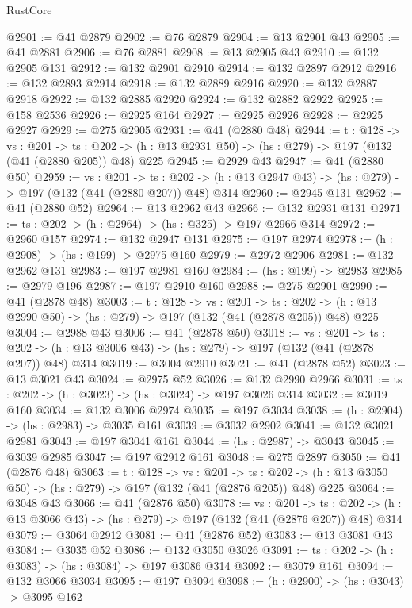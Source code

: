 \begin{lexlean}{RustCore}
\begin{coremodule}
@2901 := @41 @2879
@2902 := @76 @2879
@2904 := @13 @2901 @43
@2905 := @41 @2881
@2906 := @76 @2881
@2908 := @13 @2905 @43
@2910 := @132 @2905 @131
@2912 := @132 @2901 @2910
@2914 := @132 @2897 @2912
@2916 := @132 @2893 @2914
@2918 := @132 @2889 @2916
@2920 := @132 @2887 @2918
@2922 := @132 @2885 @2920
@2924 := @132 @2882 @2922
@2925 := @158 @2536
@2926 := @2925 @164
@2927 := @2925 @2926
@2928 := @2925 @2927
@2929 := @275 @2905
@2931 := @41 (@2880 @48)
@2944 := {t : @128} ->
  {vs : @201} ->
  {ts : @202} -> (h : @13 @2931 @50) -> (hs : @279) -> @197 (@132 (@41 (@2880 @205)) @48) @225
@2945 := @2929 @43
@2947 := @41 (@2880 @50)
@2959 := {vs : @201} ->
  {ts : @202} -> (h : @13 @2947 @43) -> (hs : @279) -> @197 (@132 (@41 (@2880 @207)) @48) @314
@2960 := @2945 @131
@2962 := @41 (@2880 @52)
@2964 := @13 @2962 @43
@2966 := @132 @2931 @131
@2971 := {ts : @202} -> (h : @2964) -> (hs : @325) -> @197 @2966 @314
@2972 := @2960 @157
@2974 := @132 @2947 @131
@2975 := @197 @2974
@2978 := (h : @2908) -> (hs : @199) -> @2975 @160
@2979 := @2972 @2906
@2981 := @132 @2962 @131
@2983 := @197 @2981 @160
@2984 := (hs : @199) -> @2983
@2985 := @2979 @196
@2987 := @197 @2910 @160
@2988 := @275 @2901
@2990 := @41 (@2878 @48)
@3003 := {t : @128} ->
  {vs : @201} ->
  {ts : @202} -> (h : @13 @2990 @50) -> (hs : @279) -> @197 (@132 (@41 (@2878 @205)) @48) @225
@3004 := @2988 @43
@3006 := @41 (@2878 @50)
@3018 := {vs : @201} ->
  {ts : @202} -> (h : @13 @3006 @43) -> (hs : @279) -> @197 (@132 (@41 (@2878 @207)) @48) @314
@3019 := @3004 @2910
@3021 := @41 (@2878 @52)
@3023 := @13 @3021 @43
@3024 := @2975 @52
@3026 := @132 @2990 @2966
@3031 := {ts : @202} -> (h : @3023) -> (hs : @3024) -> @197 @3026 @314
@3032 := @3019 @160
@3034 := @132 @3006 @2974
@3035 := @197 @3034
@3038 := (h : @2904) -> (hs : @2983) -> @3035 @161
@3039 := @3032 @2902
@3041 := @132 @3021 @2981
@3043 := @197 @3041 @161
@3044 := (hs : @2987) -> @3043
@3045 := @3039 @2985
@3047 := @197 @2912 @161
@3048 := @275 @2897
@3050 := @41 (@2876 @48)
@3063 := {t : @128} ->
  {vs : @201} ->
  {ts : @202} -> (h : @13 @3050 @50) -> (hs : @279) -> @197 (@132 (@41 (@2876 @205)) @48) @225
@3064 := @3048 @43
@3066 := @41 (@2876 @50)
@3078 := {vs : @201} ->
  {ts : @202} -> (h : @13 @3066 @43) -> (hs : @279) -> @197 (@132 (@41 (@2876 @207)) @48) @314
@3079 := @3064 @2912
@3081 := @41 (@2876 @52)
@3083 := @13 @3081 @43
@3084 := @3035 @52
@3086 := @132 @3050 @3026
@3091 := {ts : @202} -> (h : @3083) -> (hs : @3084) -> @197 @3086 @314
@3092 := @3079 @161
@3094 := @132 @3066 @3034
@3095 := @197 @3094
@3098 := (h : @2900) -> (hs : @3043) -> @3095 @162

\end{coremodule}
\end{lexlean}
